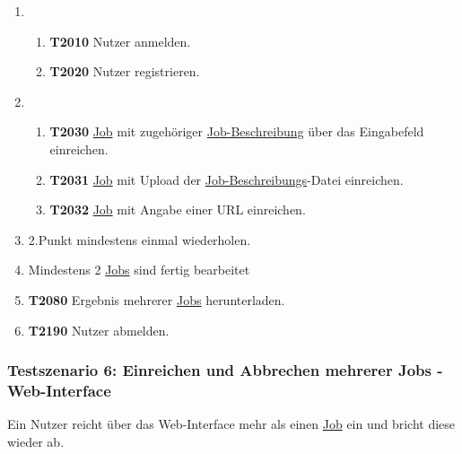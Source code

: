 \begin{enumerate}
     \item 
     \begin{enumerate}
        \item \textbf{T2010} \gls{Nutzer} anmelden.
        
        \item \textbf{T2020} \gls{Nutzer} registrieren.
     \end{enumerate}
     
     \item 
     \begin{enumerate}
        \item \textbf{T2030} \hyperref[B:Jobs]{Job} mit zugehöriger \hyperref[B:Job-Beschreibung]{Job-Beschreibung} über das Eingabefeld einreichen.
        
        \item \textbf{T2031} \hyperref[B:Jobs]{Job} mit Upload der \hyperref[B:Job-Beschreibung]{Job-Beschreibungs}-Datei einreichen.
        
        \item \textbf{T2032} \hyperref[B:Jobs]{Job} mit Angabe einer \gls{URL} einreichen.
     \end{enumerate}
     
     \item 2.Punkt mindestens einmal wiederholen.
     
     \item Mindestens 2 \hyperref[B:Jobs]{Jobs} sind fertig bearbeitet
     
     \item \textbf{T2080} Ergebnis mehrerer \hyperref[B:Jobs]{Jobs} herunterladen.
     
     \item \textbf{T2190} \gls{Nutzer} abmelden.
\end{enumerate}

\subsubsection{Testszenario 6: Einreichen und Abbrechen mehrerer Jobs - Web-Interface}
Ein \gls{Nutzer} reicht über das \gls{Web-Interface} mehr als einen \hyperref[B:Jobs]{Job} ein und bricht diese wieder ab.

